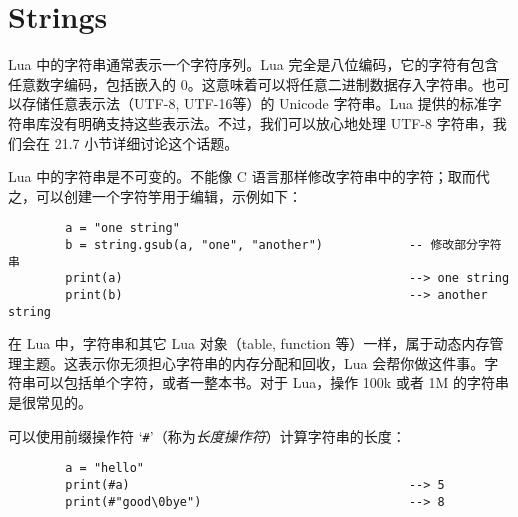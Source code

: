 \section{Strings}

Lua 中的字符串通常表示一个字符序列。Lua 完全是八位编码，它的字符有包含任意数字编码，包括嵌入的 $0$。这意味着可以将任意二进制数据存入字符串。也可以存储任意表示法（UTF-8, UTF-16等）的 Unicode 字符串。Lua 提供的标准字符串库没有明确支持这些表示法。不过，我们可以放心地处理 UTF-8 字符串，我们会在 21.7 小节详细讨论这个话题。

Lua 中的字符串是不可变的。不能像 C 语言那样修改字符串中的字符；取而代之，可以创建一个字符竽用于编辑，示例如下：

\begin{verbatim}
        a = "one string"
        b = string.gsub(a, "one", "another")            -- 修改部分字符串
        print(a)                                        --> one string
        print(b)                                        --> another string
\end{verbatim}

在 Lua 中，字符串和其它 Lua 对象（table, function 等）一样，属于动态内存管理主题。这表示你无须担心字符串的内存分配和回收，Lua 会帮你做这件事。字符串可以包括单个字符，或者一整本书。对于 Lua，操作 100k 或者 1M 的字符串是很常见的。

可以使用前缀操作符 `\verb|#|'（称为{\emph{长度操作符}}）计算字符串的长度：
\begin{verbatim}
        a = "hello"
        print(#a)                                       --> 5
        print(#"good\0bye")                             --> 8
\end{verbatim}

